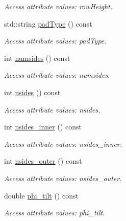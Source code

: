 \begin{DoxyCompactItemize}
\begin{DoxyCompactList}\small\item\em Access attribute values: rowHeight. \item\end{DoxyCompactList}\item 
std::string \hyperlink{struct_d_d4hep_1_1_x_m_l_1_1_child_value_a08dd54d57ee3653f62d1d8286386bbf2}{padType} () const 
\begin{DoxyCompactList}\small\item\em Access attribute values: padType. \item\end{DoxyCompactList}\item 
int \hyperlink{struct_d_d4hep_1_1_x_m_l_1_1_child_value_abeb84838cec2c9bfa67f05e4c8b98f83}{numsides} () const 
\begin{DoxyCompactList}\small\item\em Access attribute values: numsides. \item\end{DoxyCompactList}\item 
int \hyperlink{struct_d_d4hep_1_1_x_m_l_1_1_child_value_adc8cf2dc81eb12335fedc345b2120bb2}{nsides} () const 
\begin{DoxyCompactList}\small\item\em Access attribute values: nsides. \item\end{DoxyCompactList}\item 
int \hyperlink{struct_d_d4hep_1_1_x_m_l_1_1_child_value_ac0134a149a070111ad3961fe8362e438}{nsides\_\-inner} () const 
\begin{DoxyCompactList}\small\item\em Access attribute values: nsides\_\-inner. \item\end{DoxyCompactList}\item 
int \hyperlink{struct_d_d4hep_1_1_x_m_l_1_1_child_value_a0b8fdaa55044eb598fae5081b7a4fa68}{nsides\_\-outer} () const 
\begin{DoxyCompactList}\small\item\em Access attribute values: nsides\_\-outer. \item\end{DoxyCompactList}\item 
double \hyperlink{struct_d_d4hep_1_1_x_m_l_1_1_child_value_a868532f496cd5f6965158286080db18d}{phi\_\-tilt} () const 
\begin{DoxyCompactList}\small\item\em Access attribute values: phi\_\-tilt. \item\end{DoxyCompactList}\item 

\end{DoxyCompactItemize}
